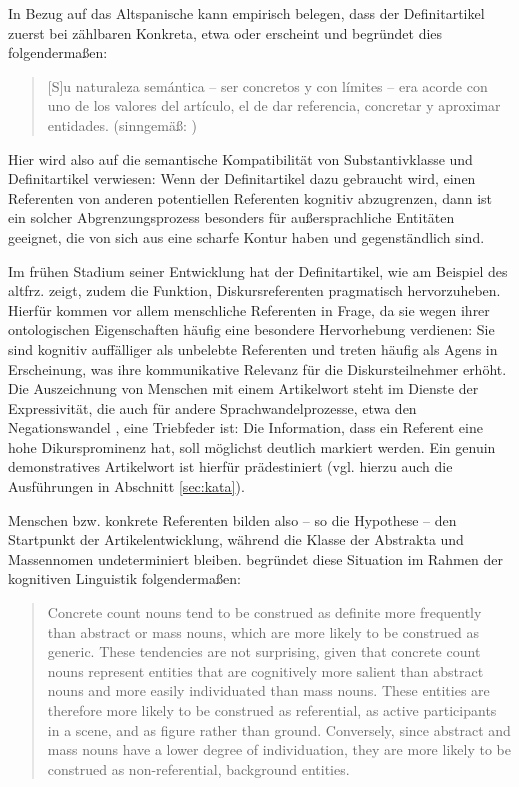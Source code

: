 In Bezug auf das Altspanische kann \textcite[421]{Company1991} empirisch belegen, dass der Definitartikel zuerst bei zählbaren Konkreta, etwa  oder  erscheint und begründet dies folgendermaßen: \blockcquote[421]{Company1991}{[S]u naturaleza semántica -- ser  concretos y con límites -- era acorde
con uno de los valores del artículo, el de dar referencia, concretar y aproximar
entidades. (sinngemäß: )} Hier wird also auf die semantische Kompatibilität von Substantivklasse und Definitartikel verwiesen:  Wenn der Definitartikel dazu gebraucht wird, einen Referenten von anderen potentiellen Referenten kognitiv abzugrenzen, dann ist ein solcher Abgrenzungsprozess besonders für außersprachliche Entitäten geeignet, die von sich aus eine scharfe Kontur haben und gegenständlich sind.

Im frühen Stadium seiner Entwicklung hat der Definitartikel, wie \textcite{Epstein1993,Epstein1994} am Beispiel des altfrz.  zeigt, zudem die Funktion, Diskursreferenten pragmatisch hervorzuheben. Hierfür kommen vor allem menschliche Referenten in Frage, da sie wegen ihrer ontologischen Eigenschaften häufig eine besondere Hervorhebung verdienen: Sie sind kognitiv auffälliger als unbelebte Referenten und treten häufig als Agens in Erscheinung, was ihre kommunikative Relevanz für die Diskursteilnehmer erhöht. Die Auszeichnung von Menschen mit einem Artikelwort steht im Dienste der Expressivität, die auch für andere Sprachwandelprozesse, etwa den Negationswandel \parencite{Jager2008}, eine Triebfeder ist: Die Information, dass ein Referent eine hohe Dikursprominenz hat, soll möglichst deutlich markiert werden. Ein genuin demonstratives Artikelwort ist hierfür prädestiniert (vgl. hierzu auch die Ausführungen in Abschnitt \ref{sec:kata}).

Menschen bzw. konkrete Referenten bilden also -- so die Hypothese -- den Startpunkt der Artikelentwicklung, während die Klasse der Abstrakta und Massennomen undeterminiert bleiben. \textcite{Epstein1994} begründet diese Situation im Rahmen der kognitiven Linguistik folgendermaßen: \blockcquote[71]{Epstein1994}{Concrete count nouns tend to be construed as definite more frequently than
abstract or mass nouns, which are more likely to be construed as generic.
These tendencies are not surprising, given that concrete count nouns represent
entities that are cognitively more salient than abstract nouns and more
easily individuated than mass nouns. These entities are therefore more
likely to be construed as referential, as active participants in a scene, and as figure rather than ground. Conversely, since abstract and mass nouns have
a lower degree of individuation, they are more likely to be construed as
non-referential, background entities.} 

